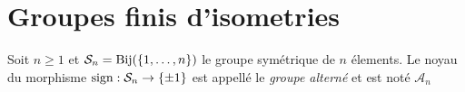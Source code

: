 \section{Groupes finis d'isometries}

\begin{definition}
	Soit $n \geq 1$ et $\mathcal{S}_n = \operatorname{Bij}(\{1, \dots, n\})$ le groupe
	symétrique de $n$ élements. Le noyau du morphisme $\operatorname{sign}: \mathcal{S}_n \to
	\{\pm1\}$ est appellé le \emph{groupe alterné} et est noté $\mathcal{A}_n$
\end{definition}
